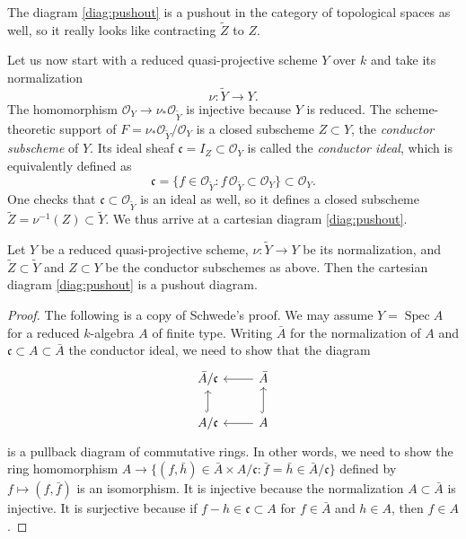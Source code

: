 \documentclass[reqno, letterpaper]{amsart}
\numberwithin{equation}{subsection}
\let\to\longrightarrow
\let\mapsto\longmapsto
\DeclareMathOperator{\Spec}{Spec}
\begin{document}
		The diagram \eqref{diag:pushout} is a pushout in the category of topological spaces as well, so it really looks like contracting $\tilde Z$ to $Z$.
		
		\medskip
		
		Let us now start with a reduced quasi-projective scheme $Y$ over $k$ and take its normalization
		\[ \nu : \tilde Y \to Y .\]
		The homomorphism $\mathcal O_Y \to \nu_* \mathcal O_{\tilde Y}$ is injective because $Y$ is reduced. The scheme-theoretic support of $F = \nu_* \mathcal O_{\tilde Y}/\mathcal O_Y$ is a closed subscheme $Z \subset Y$, the \emph{conductor subscheme} of $Y$. Its ideal sheaf $\mathfrak c = I_Z \subset \mathcal O_Y$ is called the \emph{conductor ideal}, which is equivalently defined as
		\[ \mathfrak c = \{ f \in \mathcal O_{\tilde Y} : f \, \mathcal O_{\tilde Y} \subset \mathcal O_Y \} \subset \mathcal O_Y .\]
		One checks that $\mathfrak c \subset \mathcal O_{\tilde Y}$ is an ideal as well, so it defines a closed subscheme $\tilde Z = \nu^{-1}(Z) \subset \tilde Y$. We thus arrive at a cartesian diagram \eqref{diag:pushout}.
		
		\begin{proposition}  \label{prop:conductor pushout}
			Let $Y$ be a reduced quasi-projective scheme, $\nu : \tilde Y \to Y$ be its normalization, and $\tilde Z \subset \tilde Y$ and $Z \subset Y$ be the conductor subschemes as above. Then the cartesian diagram \eqref{diag:pushout} is a pushout diagram.
		\end{proposition}
		\begin{proof}
			The following is a copy of Schwede's proof. We may assume $Y = \Spec A$ for a reduced $k$-algebra $A$ of finite type. Writing $\bar A$ for the normalization of $A$ and $\mathfrak c \subset A \subset \bar A$ the conductor ideal, we need to show that the diagram
			\begin{equation} \label{diag:schwede}
			\begin{tikzcd}
				\bar A / \mathfrak c & \bar A \arrow[l] \\
				A / \mathfrak c \arrow[u, hook] & A \arrow[l] \arrow[u, hook]
			\end{tikzcd}
			\end{equation}
			is a pullback diagram of commutative rings. In other words, we need to show the ring homomorphism $A \to \{ (f, \bar h) \in \bar A \times A/\mathfrak c : \bar f = \bar h \in \bar A / \mathfrak c \}$ defined by $f \mapsto (f, \bar f)$ is an isomorphism. It is injective because the normalization $A \subset \bar A$ is injective. It is surjective because if $f-h \in \mathfrak c \subset A$ for $f \in \bar A$ and $h \in A$, then $f \in A$.
		\end{proof}
		
\end{document}
